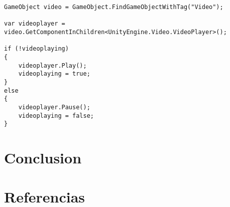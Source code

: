 \documentclass{pre-tfg}
\begin{document}
\begin{spacing}{1}
\begin{lstlisting}[float=htbp, caption=Inicio y pausa del vídeo desde el objeto con el que se interactúa, label=lst:PlayVideo]
GameObject video = GameObject.FindGameObjectWithTag("Video");

var videoplayer = video.GetComponentInChildren<UnityEngine.Video.VideoPlayer>();

if (!videoplaying)
{
	videoplayer.Play();
	videoplaying = true;
}
else
{
	videoplayer.Pause();
	videoplaying = false;
}
\end{lstlisting}
\end{spacing}

\section{Conclusion}



\section{Referencias}

\clearpage


\nocite{*}
\printbibliography
\end{document}
